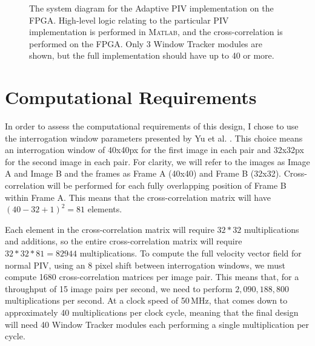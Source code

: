 \documentclass{article}
\begin{document}
\begin{figure}[htbp]
	\caption{The system diagram for the Adaptive PIV implementation on the FPGA. High-level logic relating to the particular PIV implementation is performed in \textsc{Matlab}, and the cross-correlation is performed on the FPGA. Only 3 Window Tracker modules are shown, but the full implementation should have up to 40 or more.}
	\label{fig:system}
\end{figure}

\section{Computational Requirements}
In order to assess the computational requirements of this design, I chose to use the interrogation window parameters presented by Yu et al. \citep{Yu:2006tb}. This choice means an interrogation window of 40x40px for the first image in each pair and 32x32px for the second image in each pair. For clarity, we will refer to the images as Image A and Image B and the frames as Frame A (40x40) and Frame B (32x32). Cross-correlation will be performed for each fully overlapping position of Frame B within Frame A. This means that the cross-correlation matrix will have $(40 - 32 + 1) ^2 = 81$ elements. 

Each element in the cross-correlation matrix will require $32 * 32$ multiplications and additions, so the entire cross-correlation matrix will require $32 * 32 * 81 = 82944$ multiplications. To compute the full velocity vector field for normal PIV, using an 8 pixel shift between interrogation windows, we must compute 1680 cross-correlation matrices per image pair. This means that, for a throughput of 15 image pairs per second, we need to perform $2,090,188,800$ multiplications per second. At a clock speed of 50\,MHz, that comes down to approximately 40 multiplications per clock cycle, meaning that the final design will need 40 Window Tracker modules each performing a single multiplication per cycle. 
\end{document}
